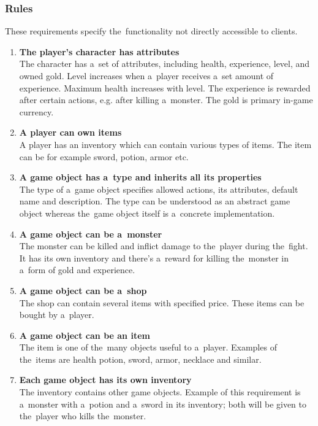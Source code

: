 		\subsubsection*{Rules}
		These requirements specify the~functionality not directly accessible to clients.
		\begin{enumerate}						
			\item \textbf{The player's character has attributes} \\
			The character has a~set of attributes, including health, experience, level, and owned gold. Level increases when a~player receives a~set amount of experience. Maximum health increases with level. The experience is rewarded after certain actions, e.g. after killing a~monster. The gold is primary in-game currency.
			  
			\item \textbf{A player can own items} \\
			A player has an inventory which can contain various types of items. The item can be for example sword, potion, armor etc. 
			
			\item \textbf{A game object has a~type and inherits all its properties} \\
			The type of a~game object specifies allowed actions, its attributes, default name and description. The type can be understood as an abstract game object whereas the~game object itself is a~concrete implementation.	
			
			\item \textbf{A game object can be a~monster} \\
			The monster can be killed and inflict damage to the~player during the~fight. It has its own inventory and there's a~reward for killing the~monster in a~form of gold and experience.
			
			\item \textbf{A game object can be a~shop} \\
			The shop can contain several items with specified price. These items can be bought by a~player. 
			
			\item \textbf{A game object can be an item} \\	
			The item is one of the~many objects useful to a~player. Examples of the~items are health potion, sword, armor, necklace and similar.
			
			\item \textbf{Each game object has its own inventory} \\
			The inventory contains other game objects. Example of this requirement is a~monster with a~potion and a~sword in its inventory; both will be given to the~player who kills the~monster.  
			

\end{enumerate}
